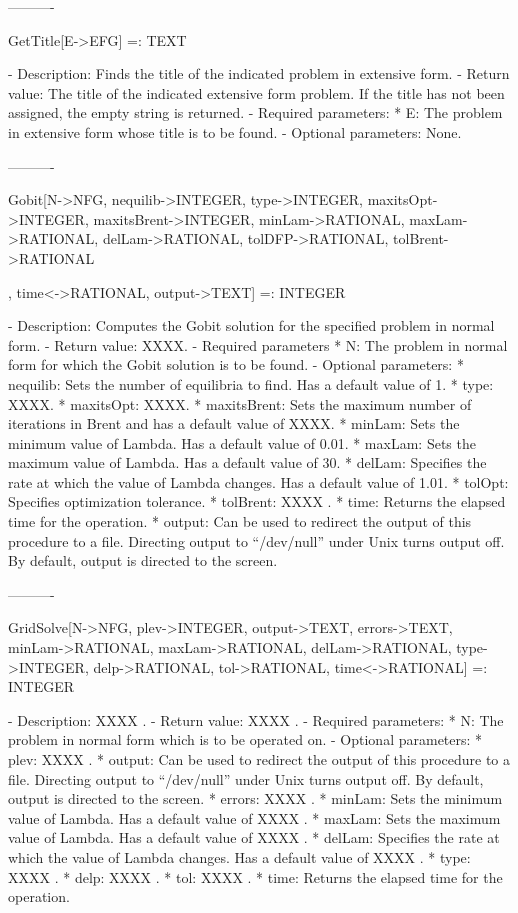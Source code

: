 {----------

GetTitle[E->EFG] =: TEXT

   -	Description:  Finds the title of the indicated problem in extensive 
	form.
   -	Return value:  The title of the indicated extensive form problem.  If
	the title has not been assigned, the empty string is returned.
   -	Required parameters:
	  *  E:  The problem in extensive form whose title is to be found.
   -	Optional parameters:  None.

----------

Gobit[N->NFG, {nequilib->INTEGER}, {type->INTEGER},
	{maxitsOpt->INTEGER}, {maxitsBrent->INTEGER}, {minLam->RATIONAL},
	{maxLam->RATIONAL}, {delLam->RATIONAL}, {tolDFP->RATIONAL},
	{tolBrent}->RATIONAL}, {time<->RATIONAL}, {output->TEXT}] =: INTEGER

   -	Description:  Computes the Gobit solution for the specified problem in
	normal form.  
   -	Return value:  XXXX.
   -	Required parameters
	  *  N:  The problem in normal form for which the Gobit solution is to
		be found.
   -	Optional parameters:
	  *  nequilib:  Sets the number of equilibria to find.  Has a default 
		value of 1.  
	  *  type:   XXXX.  
	  *  maxitsOpt:  XXXX.
	  *  maxitsBrent:  Sets the maximum number of iterations in Brent and 
		has a default value of XXXX.  
	  *  minLam:  Sets the minimum value of Lambda.  Has a default value of
		0.01.
	  *  maxLam:  Sets the maximum value of Lambda.  Has a default value of
		30.
	  *  delLam:  Specifies the rate at which the value of Lambda changes.
		Has a default value of 1.01.
	  *  tolOpt:  Specifies optimization tolerance.
	  *  tolBrent:  XXXX .
	  *  time:  Returns the elapsed time for the operation.
	  *  output:  Can be used to redirect the output of this procedure to a
		file.  Directing output to ``/dev/null'' under Unix turns 
		output off.  By default, output is directed to the screen.

----------

GridSolve[N->NFG, {plev->INTEGER}, {output->TEXT}, {errors->TEXT},
	{minLam->RATIONAL}, {maxLam->RATIONAL}, {delLam->RATIONAL}, 
	{type->INTEGER}, {delp->RATIONAL}, {tol->RATIONAL}, {time<->RATIONAL}]
	 =: INTEGER

   -	Description:  XXXX .
   -	Return value:  XXXX .
   -	Required parameters:
	  *  N:  The problem in normal form which is to be operated on.
   -	Optional parameters:
	  *  plev:  XXXX .
	  *  output:  Can be used to redirect the output of this procedure to a
		file.  Directing output to ``/dev/null'' under Unix turns 
		output off.  By default, output is directed to the screen.
	  *  errors:  XXXX .
	  *  minLam:  Sets the minimum value of Lambda.  Has a default value of
		XXXX .
	  *  maxLam:  Sets the maximum value of Lambda.  Has a default value of
		XXXX .
	  *  delLam:  Specifies the rate at which the value of Lambda changes.
		Has a default value of XXXX .
	  *  type:  XXXX .
	  *  delp:  XXXX .
	  *  tol:  XXXX .
	  *  time:  Returns the elapsed time for the operation.

